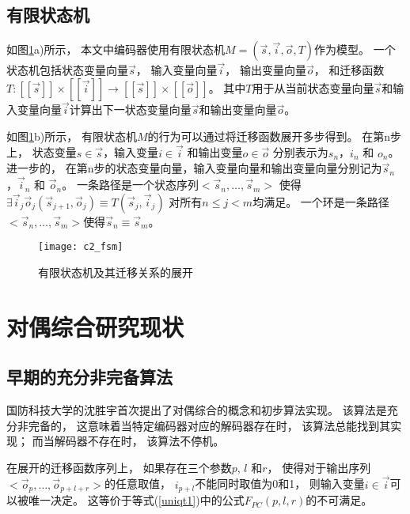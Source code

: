 \subsection{有限状态机}

如图\ref{c2_fsm}a)所示，
本文中编码器使用有限状态机$M=(\vec{s},\vec{i},\vec{o},T)$作为模型。
一个状态机包括状态变量向量$\vec{s}$，
输入变量向量$\vec{i}$，
输出变量向量$\vec{o}$，
和迁移函数$T: [\![\vec{s}]\!]\times [\![\vec{i}]\!]\to [\![\vec{s}]\!]\times [\![\vec{o}]\!]$。
其中$T$用于从当前状态变量向量$\vec{s}$和输入变量向量$\vec{i}$计算出下一状态变量向量$\vec{s}$和输出变量向量$\vec{o}$。

如图\ref{c2_fsm}b)所示，
有限状态机$M$的行为可以通过将迁移函数展开多步得到。
在第n步上，
状态变量$s\in\vec{s}$，输入变量$i\in\vec{i}$ 和输出变量$o\in\vec{o}$
分别表示为$s_n$，$i_n$ 和 $o_n$。
进一步的，
在第n步的状态变量向量，输入变量向量和输出变量向量分别记为$\vec{s}_n$，$\vec{i}_n$ 和 $\vec{o}_n$。
一条路径是一个状态序列$<\vec{s}_n,\dots,\vec{s}_m>$ 使得$\exists \vec{i}_j\vec{o}_j (\vec{s}_{j+1},\vec{o}_j)\equiv T(\vec{s}_j,\vec{i}_j)$ 对所有$n\le j< m$均满足。
一个环是一条路径$<\vec{s}_n,\dots,\vec{s}_m>$使得$\vec{s}_n\equiv \vec{s}_m$。

\begin{figure}[t]
  \centering
  \texttt{[image: c2\_fsm]}
  \caption{有限状态机及其迁移关系的展开}
  \label{c2_fsm}
\end{figure}


\section{对偶综合研究现状}

\subsection{早期的充分非完备算法}

国防科技大学的沈胜宇首次提出了对偶综合的概念和初步算法实现。
该算法是充分非完备的，
这意味着当特定编码器对应的解码器存在时，
该算法总能找到其实现；
而当解码器不存在时，
该算法不停机。

在展开的迁移函数序列上，
如果存在三个参数$p$, $l$ 和$r$，
使得对于输出序列$<\vec{o}_p,\dots,\vec{o}_{p+l+r}>$的任意取值，
$i_{p+l}$不能同时取值为0和1，
则输入变量$i\in\vec{i}$可以被唯一决定。
这等价于等式(\ref{uniqt1})中的公式$F_{PC}(p,l,r)$的不可满足。

